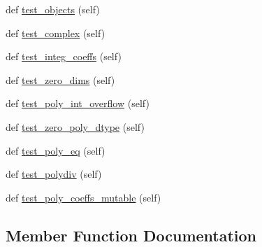 \begin{DoxyCompactItemize}
def \hyperlink{classnumpy_1_1lib_1_1tests_1_1test__polynomial_1_1TestPolynomial_ac93bd2975fba6f7c2514e9fde32225ac}{test\+\_\+objects} (self)
\item 
def \hyperlink{classnumpy_1_1lib_1_1tests_1_1test__polynomial_1_1TestPolynomial_a11af306de7054678dcbb8d592afe1cbe}{test\+\_\+complex} (self)
\item 
def \hyperlink{classnumpy_1_1lib_1_1tests_1_1test__polynomial_1_1TestPolynomial_ad2c0987f0477aab37decf2eda81ad44c}{test\+\_\+integ\+\_\+coeffs} (self)
\item 
def \hyperlink{classnumpy_1_1lib_1_1tests_1_1test__polynomial_1_1TestPolynomial_aef16b456aad40aec72b619c31206c157}{test\+\_\+zero\+\_\+dims} (self)
\item 
def \hyperlink{classnumpy_1_1lib_1_1tests_1_1test__polynomial_1_1TestPolynomial_a9d41ac14dca28961457fd8a3107d7556}{test\+\_\+poly\+\_\+int\+\_\+overflow} (self)
\item 
def \hyperlink{classnumpy_1_1lib_1_1tests_1_1test__polynomial_1_1TestPolynomial_aecb0a9c8fa33f0c4e685498fdd723fc1}{test\+\_\+zero\+\_\+poly\+\_\+dtype} (self)
\item 
def \hyperlink{classnumpy_1_1lib_1_1tests_1_1test__polynomial_1_1TestPolynomial_ad2f2d1507bd4a123f94958ac7381a86a}{test\+\_\+poly\+\_\+eq} (self)
\item 
def \hyperlink{classnumpy_1_1lib_1_1tests_1_1test__polynomial_1_1TestPolynomial_a7767f05820ef4a0191c19df32bc4df97}{test\+\_\+polydiv} (self)
\item 
def \hyperlink{classnumpy_1_1lib_1_1tests_1_1test__polynomial_1_1TestPolynomial_a0cc893bea7616a418ed9a5242c28f797}{test\+\_\+poly\+\_\+coeffs\+\_\+mutable} (self)
\end{DoxyCompactItemize}


\subsection{Member Function Documentation}
\mbox{\label{classnumpy_1_1lib_1_1tests_1_1test__polynomial_1_1TestPolynomial_a11af306de7054678dcbb8d592afe1cbe}} 
